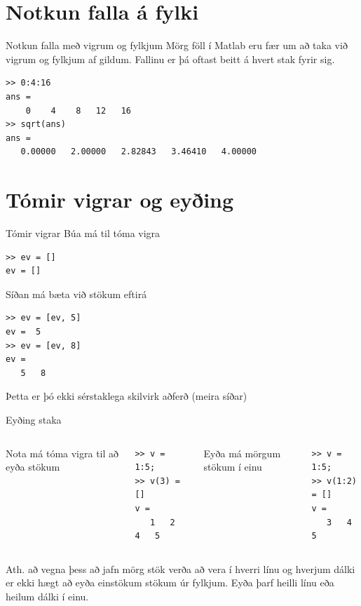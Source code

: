 \documentclass[handout]{beamer}
\begin{document}
\section{Notkun falla á fylki}

\begin{frame}[fragile]{Notkun falla með vigrum og fylkjum}
Mörg föll í Matlab eru fær um að taka við vigrum og fylkjum af gildum. Fallinu er þá oftast beitt á hvert stak fyrir sig.
\begin{verbatim}
>> 0:4:16
ans =
    0    4    8   12   16
>> sqrt(ans)
ans =
   0.00000   2.00000   2.82843   3.46410   4.00000
\end{verbatim}
\end{frame}

\section{Tómir vigrar og eyðing}

\begin{frame}[fragile]{Tómir vigrar}
Búa má til tóma vigra
\begin{verbatim}
>> ev = []
ev = []
\end{verbatim}
Síðan má bæta við stökum eftirá
\begin{verbatim}
>> ev = [ev, 5]
ev =  5
>> ev = [ev, 8]
ev =
   5   8
\end{verbatim}
Þetta er þó ekki sérstaklega skilvirk aðferð (meira síðar)
\end{frame}

\begin{frame}[fragile]{Eyðing staka}
\begin{columns}
Nota má tóma vigra til að eyða stökum
\begin{verbatim}
>> v = 1:5;
>> v(3) = []
v =
   1   2   4   5

\end{verbatim}
Eyða má mörgum stökum í einu
\begin{verbatim}
>> v = 1:5;
>> v(1:2) = []
v =
   3   4   5
\end{verbatim}
\end{columns}
\vspace{\baselineskip}
Ath. að vegna þess að jafn mörg stök verða að vera í hverri línu og hverjum dálki er ekki hægt að eyða einstökum stökum úr fylkjum. Eyða þarf heilli línu eða heilum dálki í einu.
\end{frame}
\end{document}
